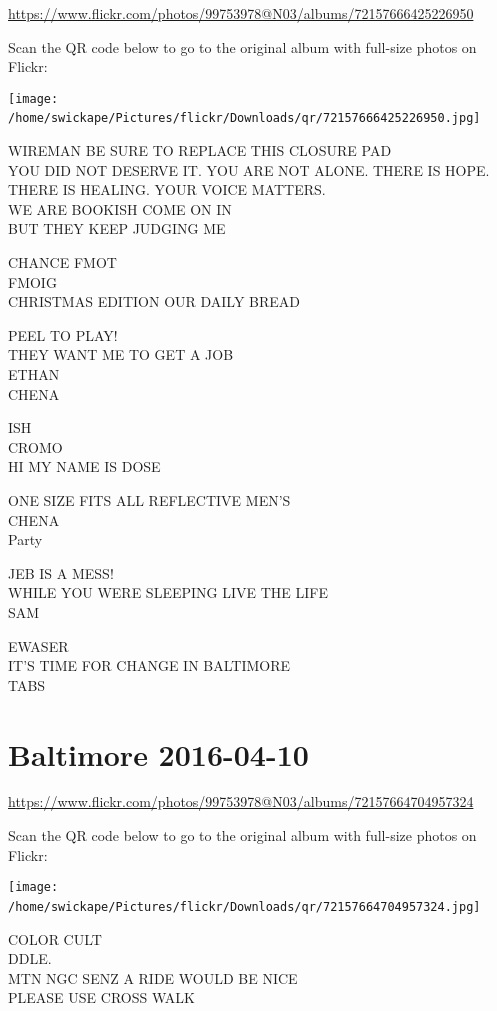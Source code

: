 \documentclass[10pt,letterpaper]{article}
\begin{document}
\url{https://www.flickr.com/photos/99753978@N03/albums/72157666425226950}

Scan the QR code below to go to the original album with full-size photos on Flickr:

\texttt{[image: /home/swickape/Pictures/flickr/Downloads/qr/72157666425226950.jpg]}
\

WIREMAN BE SURE TO REPLACE THIS CLOSURE PAD\\
YOU DID NOT DESERVE IT. YOU ARE NOT ALONE. THERE IS HOPE. THERE IS HEALING. YOUR VOICE MATTERS.\\
WE ARE BOOKISH COME ON IN\\
BUT THEY KEEP JUDGING ME

CHANCE FMOT\\
FMOIG\\
CHRISTMAS EDITION OUR DAILY BREAD

PEEL TO PLAY!\\
THEY WANT ME TO GET A JOB\\
ETHAN\\
CHENA

ISH\\
CROMO\\
HI MY NAME IS DOSE

ONE SIZE FITS ALL REFLECTIVE MEN'S\\
CHENA\\
Party

JEB IS A MESS!\\
WHILE YOU WERE SLEEPING LIVE THE LIFE\\
SAM

EWASER\\
IT'S TIME FOR CHANGE IN BALTIMORE\\
TABS
\

\section*{Baltimore 2016-04-10}

\url{https://www.flickr.com/photos/99753978@N03/albums/72157664704957324}

Scan the QR code below to go to the original album with full-size photos on Flickr:

\texttt{[image: /home/swickape/Pictures/flickr/Downloads/qr/72157664704957324.jpg]}
\

COLOR CULT\\
DDLE.\\
MTN NGC SENZ A RIDE WOULD BE NICE\\
PLEASE USE CROSS WALK
\end{document}
